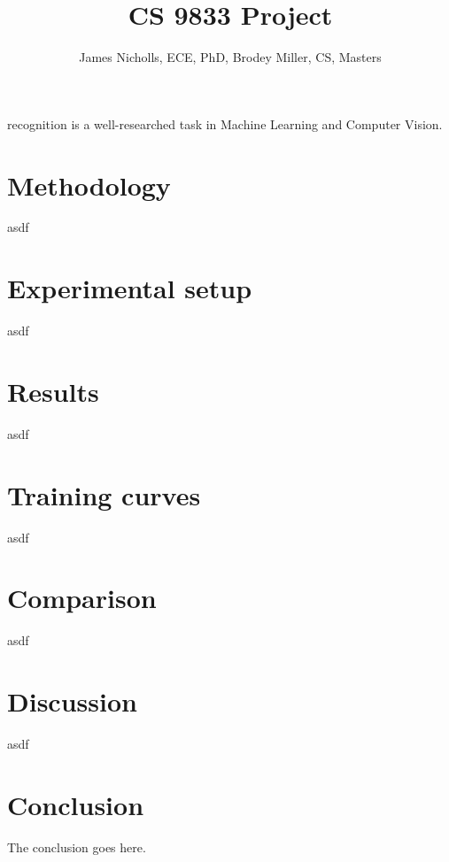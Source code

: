 \documentclass[10pt,journal,compsoc]{IEEEtran}
\begin{document}
\title{CS 9833 Project}

\author{James Nicholls, ECE, PhD, Brodey Miller, CS, Masters}



\maketitle


\IEEEdisplaynontitleabstractindextext
\IEEEpeerreviewmaketitle
{}
 recognition is a well-researched task in Machine Learning and Computer Vision.

\section{Methodology}
asdf

\section{Experimental setup}
asdf

\section{Results}
asdf

\section{Training curves}
asdf

\section{Comparison}
asdf

\section{Discussion}
asdf

\section{Conclusion}
The conclusion goes here.
\cite{krizhevsky_cifar_2009}



\end{document}
